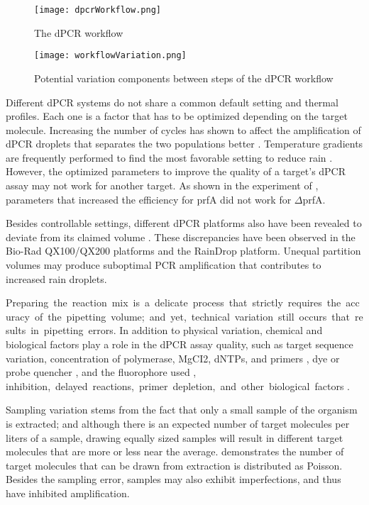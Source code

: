\begin{figure}[h]
    \centering
    \texttt{[image: dpcrWorkflow.png]}
    \caption{The dPCR workflow}
        \label{fig:dpcrWorkflow}
\end{figure}

\begin{figure}[h]
    \centering
    \texttt{[image: workflowVariation.png]}
    \caption{Potential variation components between steps of the dPCR workflow}
        \label{fig:workflowVariation}
\end{figure}

Different dPCR systems do not share a common default setting and thermal profiles. Each one is a factor that has to be optimized depending on the target molecule. Increasing the number of cycles has shown to affect the amplification of dPCR droplets that separates the two populations better \cite{Koppel2015}. Temperature gradients are frequently performed to find the most favorable setting to reduce rain \cite{Gerdes2016}. However, the optimized parameters to improve the quality of a target's dPCR assay may not work for another target. As shown in the experiment of , parameters that increased the efficiency for prfA did not work for \(\Delta\)prfA.

Besides controllable settings, different dPCR platforms also have been revealed to deviate from its claimed volume \cite{Pinheiro2012,Dong2015,Corbisier2015,Dagata2016,Kosir2017}. These discrepancies have been observed in the Bio-Rad QX100/QX200 platforms and the RainDrop platform. Unequal partition volumes may produce suboptimal PCR amplification that contributes to increased rain droplets.

Preparing the reaction mix is a delicate process that strictly requires the accuracy of the pipetting volume; and yet, technical variation still occurs that results in pipetting errors. In addition to physical variation, chemical and biological factors play a role in the dPCR assay quality, such as target sequence variation, concentration of polymerase, MgCI2, dNTPs, and primers \cite{Koppel2015, Kramer2001}, dye or probe quencher \cite{Witte2016}, and the fluorophore used \cite{Gerdes2016}, inhibition, delayed reactions, primer depletion, and other biological factors \cite{Jacobs2014}.

Sampling variation stems from the fact that only a small sample of the organism is extracted; and although there is an expected number of target molecules per liters of a sample, drawing equally sized samples will result in different target molecules that are more or less near the average.  demonstrates the number of target molecules that can be drawn from extraction is distributed as Poisson. Besides the sampling error, samples may also exhibit imperfections, and thus have inhibited amplification. 

